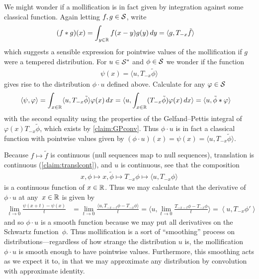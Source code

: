     We might wonder if a mollification is in fact given by integration against some classical function.
    Again letting $f,g\in\S$, write
    \begin{align*}
      (f*g)(x)
      &= \int_{y\in\R} f(x-y)g(y)\,dy
      = \langle g, T_{-x}\tilde f\rangle
    \end{align*}
    which suggests a sensible expression for pointwise values of the mollification if $g$ were a tempered distribution.
    For $u\in\SS$ and $\phi\in\S$ we wonder if the function
    \begin{align*}
      \psi(x) = \langle u, T_{-x}\tilde\phi\rangle
    \end{align*}
    gives rise to the distribution $\phi\cdot u$ defined above.
    Calculate for any $\varphi\in\S$
    \begin{align*}
      \langle \psi, \varphi \rangle
      &= \int_{x\in\R} \langle u,T_{-x}\tilde\phi\rangle\varphi(x)\,dx
      = \langle u, \int_{x\in\R} (T_{-x}\tilde\phi)\varphi(x)\,dx \rangle
      = \langle u, \tilde\phi*\varphi\rangle
    \end{align*}
    with the second equality using the properties of the Gelfand--Pettis integral of $\varphi(x)T_{-x}\tilde\phi$, which exists by \cref{claim:GPconv}.
    Thus $\phi\cdot u$ is in fact a classical function with pointwise values given by $(\phi\cdot u)(x)=\psi(x)=\langle u, T_{-x}\tilde\phi\rangle$.

    Because $f\mapsto\tilde f$ is continuous (null sequences map to null sequences), translation is continuous (\cref{claim:translcont}), and $u$ is continuous, see that the composition
    \begin{align*}
      x, \phi \mapsto x, \tilde\phi \mapsto T_{-x}\phi \mapsto \langle u, T_{-x}\phi \rangle
    \end{align*}
    is a continuous function of $x\in\R$.
    Thus we may calculate that the derivative of $\phi\cdot u$ at any~$x\in\R$ is given by
    \begin{align*}
      \lim_{t\rightarrow0} \frac{\psi(x+t) - \psi(x)}{t}
      &= \lim_{t\rightarrow0} \frac{\langle u, T_{-x-t}\phi-T_{-x}\phi\rangle}{t}
      = \langle u, \lim_{t\rightarrow0} \frac{T_{-x-t}\phi-T_{-x}\phi}{t} \rangle
      = \left\langle u, T_{-x}\phi'\right\rangle
    \end{align*}
    and so $\phi\cdot u$ is a smooth function because we may put all derivatives on the Schwartz function~$\phi$.
    Thus mollification is a sort of ``smoothing'' process on distributions---regardless of how strange the distribution $u$ is, the mollification $\phi\cdot u$ is smooth enough to have pointwise values.
    Furthermore, this smoothing acts as we expect it to, in that we may approximate any distribution by convolution with approximate identity. 

